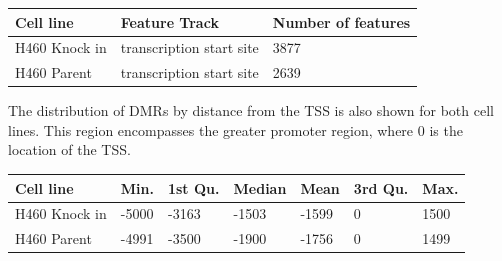 \documentclass[11pt]{article}
\begin{document}
\newpage

\begin{table}[H]
\centering
	\begin{tabular}{|l|l|l|}
	\hline
		Cell line & Feature Track & Number of features \\ \hline
		H460 Knock in & transcription start site & 3877 \\ \hline
		H460 Parent & transcription start site & 2639 \\ \hline
	\end{tabular}
\end{table}


The distribution of DMRs by distance from the TSS is also shown for both cell lines. This region encompasses the greater promoter region, where 0 is the location of the TSS.

\begin{table}[H]
\centering
    \begin{tabular}{|l|l|l|l|l|l|l|}
    \hline
     Cell line & Min. & 1st Qu. & Median & Mean & 3rd Qu. &   Max.  \\ \hline
   H460 Knock in  &  -5000  & -3163  & -1503 &  -1599  & 0  &  1500   \\ \hline
   H460 Parent & -4991  & -3500 &  -1900 &  -1756   &    0  &  1499   \\ \hline
    \end{tabular}
\end{table}
\end{document}

